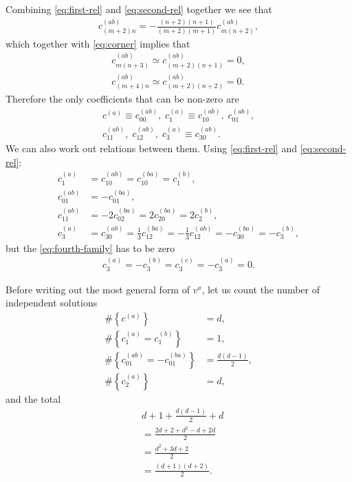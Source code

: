 \documentclass[aps,prd,final,twocolumn,floats,floatfix,nofootinbib,10pt]{revtex4-1}
\begin{document}
Combining \eqref{eq:first-rel} and \eqref{eq:second-rel} together we see that
\begin{align} \label{eq:third-rel}
  c^{(ab)}_{(m + 2) n} = -\frac{(n + 2) (n + 1)}{(m + 2) (m + 1)}
    c^{(ab)}_{m (n + 2)},
\end{align}
which together with \eqref{eq:corner} implies that
\begin{align}
  c^{(ab)}_{m (n + 3)} \simeq c^{(ab)}_{(m + 2) (n + 1)} = 0, \\
  c^{(ab)}_{(m + 4) n} \simeq c^{(ab)}_{(m + 2) (n + 2)} = 0.
\end{align}
Therefore the only coefficients that can be non-zero are
\begin{align}
  c^{(a)} \equiv c^{(ab)}_{00}, \; c^{(a)}_{1} \equiv c^{(ab)}_{10}, \;
  c^{(ab)}_{01}, \\
  c^{(ab)}_{11}, \; c^{(ab)}_{12}, \; c^{(a)}_{3} \equiv c^{(ab)}_{30}.
\end{align}
We can also work out relations between them. Using \eqref{eq:first-rel} and
\eqref{eq:second-rel}:
\begin{align}
  c^{(a)}_{1} & = c^{(ab)}_{10} = c^{(ba)}_{10} = c^{(b)}_{1},
    \label{eq:first-family} \\
  c^{(ab)}_{01} & = -c^{(ba)}_{01} \label{eq:second-family}, \\
  c^{(ab)}_{11} & = -2 c^{(ba)}_{02} = 2 c^{(ba)}_{20} = 2 c^{(b)}_{2},
    \label{eq:third-family} \\
  c^{(a)}_{3} & = c^{(ab)}_{30} = \frac{1}{3} c^{(ba)}_{12} =
    -\frac{1}{3} c^{(ab)}_{12} = -c^{(ba)}_{30} = -c^{(b)}_3{}
    \label{eq:fourth-family},
\end{align}
but the \eqref{eq:fourth-family} has to be zero
\begin{align}
  c^{(a)}_{3} = -c^{(b)}_{3} = c^{(c)}_{3} = -c^{(a)}_3 = 0.
\end{align}

Before writing out the most general form of $v^a$, let us count the number of
independent solutions
\begin{align}
  \# \left\{ c^{(a)} \right\} & = d, \\
  \# \left\{ c^{(a)}_1 = c^{(b)}_1 \right\} & = 1, \\
  \# \left\{ c^{(ab)}_{01} = - c^{(ba)}_{01} \right\} & =
    \frac{d (d - 1)}{2}, \\
  \# \left\{ c^{(a)}_{2} \right\} & = d,
\end{align}
and the total
\begin{align}
  & d + 1 + \frac{d (d - 1)}{2} + d \\
  & = \frac{2 d + 2 + d^2 - d + 2 d}{2} \\
  & = \frac{d^2 + 3 d + 2}{2} \\
  & = \frac{(d + 1) (d + 2)}{2}.
\end{align}
\end{document}
